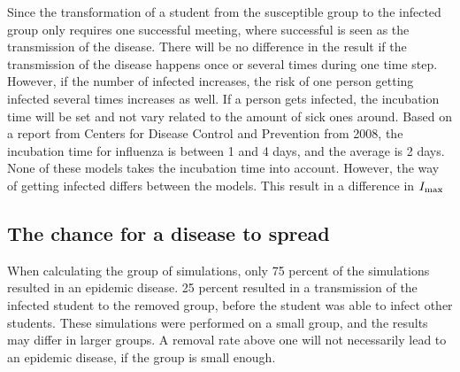 \documentclass[%
twoside,                 %
final,                   %
chapterprefix=true,      %
open=right               %
10pt]{book}
\begin{document}
\vspace{3mm}




\vspace{3mm}


Since the transformation of a student from the susceptible group to the infected group only requires one successful meeting, where successful is seen as the transmission of the disease. There will be no difference in the result if the transmission of the disease happens once or several times during one time step. However, if the number of infected increases, the risk of one person getting infected several times increases as well. If a person gets infected, the incubation time will be set and not vary related to the amount of sick ones around. Based on a report from Centers for Disease Control and Prevention from 2008, the incubation time for influenza is between 1 and 4 days, and the average is 2 days. None of these models takes the incubation time into account. However, the way of getting infected differs between the models. This result in a difference in $I_{\textrm{max}}$ 

\subsection{The chance for a disease to spread}
When calculating the group of simulations, only 75 percent of the simulations resulted in an epidemic disease. 25 percent resulted in a transmission of the infected student to the removed group, before the student was able to infect other students. These simulations were performed on a small group, and the results may differ in larger groups. A removal rate above one will not necessarily lead to an epidemic disease, if the group is small enough.

\end{document}
